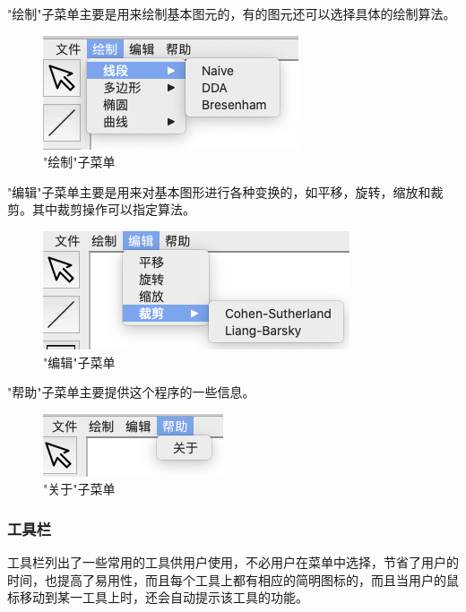 \documentclass[11pt, a4paper, UTF8]{ctexart}
\begin{document}
"绘制"子菜单主要是用来绘制基本图元的，有的图元还可以选择具体的绘制算法。

\begin{figure}[H]
    \centering
    \includegraphics[scale=1.0]{menu_draw.png}
    \caption{"绘制"子菜单}
\end{figure}


"编辑"子菜单主要是用来对基本图形进行各种变换的，如平移，旋转，缩放和裁剪。其中裁剪操作可以指定算法。

\begin{figure}[H]
    \centering
    \includegraphics[scale=0.9]{menu_edit.png}
    \caption{"编辑"子菜单}
\end{figure}


"帮助"子菜单主要提供这个程序的一些信息。

\begin{figure}[H]
    \centering
    \includegraphics[scale=1.5]{menu_help.png}
    \caption{"关于"子菜单}
\end{figure}



\subsubsection{工具栏}

工具栏列出了一些常用的工具供用户使用，不必用户在菜单中选择，节省了用户的时间，也提高了易用性，而且每个工具上都有相应的简明图标的，而且当用户的鼠标移动到某一工具上时，还会自动提示该工具的功能。
\end{document}
